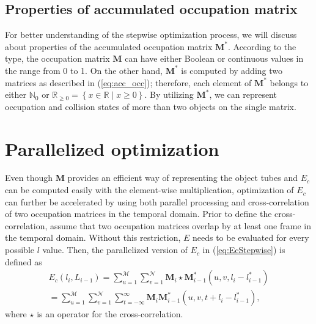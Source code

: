 \documentclass[11pt]{hyu_thesis}
\begin{document}
\subsection{Properties of accumulated occupation matrix}
For better understanding of the stepwise optimization process, we will discuss about properties of the accumulated occupation matrix $\textbf{M}^{*}$. According to the type, the occupation matrix $\textbf{M}$ can have either Boolean or continuous values in the range from 0 to 1. On the other hand, $\textbf{M}^{*}$ is computed by adding two matrices as described in (\ref{eq:acc_occ}); therefore, each element of $\textbf{M}^{*}$ belongs to either $\mathbb{N}_{0}$ or $\mathbb{R}_{\geq 0}=\left\{ x \in \mathbb{R} \mid x \geq 0  \right\}$. By utilizing $\textbf{M}^{*}$, we can represent occupation and collision states of more than two objects on the single matrix.

\section{Parallelized optimization}
Even though $\textbf{M}$ provides an efficient way of representing the object tubes and $E_c$ can be computed easily with the element-wise multiplication, optimization of $E_c$ can further be accelerated by using both parallel processing and cross-correlation of two occupation matrices in the temporal domain. Prior to define the cross-correlation, assume that two occupation matrices overlap by at least one frame in the temporal domain. Without this restriction, $E$ needs to be evaluated for every possible $l$ value. Then, the parallelized version of $E_c$ in (\ref{eq:EcStepwise}) is defined as
\begin{equation}
\label{eq:EcPP}
\begin{aligned}
E_c(l_i, L_{i-1}) = \sum_{u=1}^{\mathcal{M}} \sum_{v=1}^{\mathcal{N}} \textbf{M}_{i} \star \textbf{M}_{i-1}^{*}(u, v, l_i - l_{i-1}^{*}) \\
= \sum_{u=1}^{\mathcal{M}} \sum_{v=1}^{\mathcal{N}} \sum_{t=-\infty}^{\infty} \textbf{M}_{i}\textbf{M}_{i-1}^{*}(u, v, t + l_i - l_{i-1}^{*}),
\end{aligned}
\end{equation}
where $\star$ is an operator for the cross-correlation.
\end{document}

